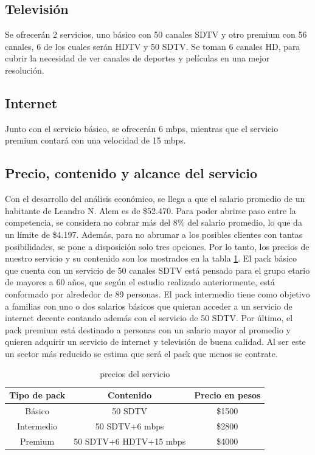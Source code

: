 \documentclass[11pt,a4paper]{article}
\begin{document}
\subsection{Televisión}

Se ofrecerán 2 servicios, uno básico con 50 canales SDTV y otro premium con 56 canales, 6 de los cuales serán HDTV y 50 SDTV. 
Se toman 6 canales HD, para cubrir la necesidad de ver canales de deportes y películas en una mejor resolución.

\subsection{Internet}

Junto con el servicio básico, se ofrecerán 6 mbps, mientras que el servicio premium contará con una velocidad de 15 mbps.

\subsection{Precio, contenido y alcance del servicio}

Con el desarrollo del análisis económico, se llega a que el salario promedio de un habitante de Leandro N. Alem es de \$52.470.
Para poder abrirse paso entre la competencia, se considera no cobrar más del 8\% del salario promedio, lo que da un límite de \$4.197.
Además, para no abrumar a los posibles clientes con tantas posibilidades, se pone a disposición solo tres opciones. 
Por lo tanto, los precios de nuestro servicio y su contenido son los mostrados en la tabla \ref{tab:precios}. 
El pack básico que cuenta con un servicio de 50 canales SDTV está pensado para el grupo etario de mayores a 60 años, que según el estudio realizado anteriormente, está conformado por alrededor de 89 personas. 
El pack intermedio tiene como objetivo a familias con uno o dos salarios básicos que quieran acceder a un servicio de internet decente contando además con el servicio de 50 SDTV. 
Por último, el pack premium está destinado a personas con un salario mayor al promedio y quieren adquirir un servicio de internet y televisión de buena calidad.
Al ser este un sector más reducido se estima que será el pack que menos se contrate.


\begin{table}[htbp]
  \centering
    \begin{tabular}{|c|c|c|}
    \hline
    Tipo de pack & Contenido & Precio en pesos \\
    \hline
    Básico & 50 SDTV & \$1500 \\
    \hline
    Intermedio & 50 SDTV+6 mbps &  \$2800 \\
    \hline
    Premium & 50 SDTV+6 HDTV+15 mbps & \$4000 \\
    \hline
    \end{tabular}%
  \caption{precios del servicio}
  \label{tab:precios}%
\end{table}%
\end{document}
